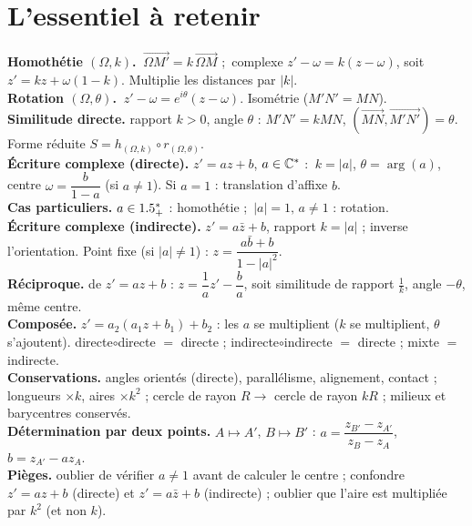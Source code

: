\section{L'essentiel à retenir}

\begin{synthese}
\textbf{Homothétie $(\Omega,k)$.} $\ \overrightarrow{\Omega M'}=k\,\overrightarrow{\Omega M}$ ;\
complexe $z'-\omega=k(z-\omega)$, soit $z'=kz+\omega(1-k)$. Multiplie les distances par $|k|$.\\[4pt]
\textbf{Rotation $(\Omega,\theta)$.} $\ z'-\omega=e^{i\theta}(z-\omega)$. Isométrie ($M'N'=MN$).\\[4pt]
\textbf{Similitude directe.} rapport $k>0$, angle $\theta$ : $M'N'=kMN$, $(\overrightarrow{MN},\overrightarrow{M'N'})=\theta$.
Forme réduite $S=h_{(\Omega,k)}\circ r_{(\Omega,\theta)}$.\\[4pt]
\textbf{Écriture complexe (directe).} $z'=az+b$, $a\in\mathbb{C}^*$ : $\ k=|a|$, $\theta=\arg(a)$, centre
$\omega=\dfrac{b}{1-a}$ (si $a\neq1$). Si $a=1$ : translation d'affixe $b$.\\[4pt]
\textbf{Cas particuliers.} $a\in1.5_+^*$ : homothétie ;\ $|a|=1,\,a\neq1$ : rotation.\\[4pt]
\textbf{Écriture complexe (indirecte).} $z'=a\bar z+b$, rapport $k=|a|$ ; inverse l'orientation. Point
fixe (si $|a|\neq1$) : $z=\dfrac{a\bar b+b}{1-|a|^2}$.\\[4pt]
\textbf{Réciproque.} de $z'=az+b$ : $z=\dfrac1a z'-\dfrac ba$, soit similitude de rapport $\tfrac1k$, angle $-\theta$,
même centre.\\[4pt]
\textbf{Composée.} $z'=a_2(a_1z+b_1)+b_2$ : les $a$ se multiplient ($k$ se multiplient, $\theta$ s'ajoutent).
directe$\circ$directe $=$ directe ; indirecte$\circ$indirecte $=$ directe ; mixte $=$ indirecte.\\[4pt]
\textbf{Conservations.} angles orientés (directe), parallélisme, alignement, contact ; longueurs $\times k$,
aires $\times k^2$ ; cercle de rayon $R\to$ cercle de rayon $kR$ ; milieux et barycentres conservés.\\[4pt]
\textbf{Détermination par deux points.} $A\mapsto A'$, $B\mapsto B'$ : $a=\dfrac{z_{B'}-z_{A'}}{z_B-z_A}$,\
$b=z_{A'}-a z_A$.\\[4pt]
\textbf{Pièges.} oublier de vérifier $a\neq1$ avant de calculer le centre ; confondre $z'=az+b$ (directe)
et $z'=a\bar z+b$ (indirecte) ; oublier que l'aire est multipliée par $k^2$ (et non $k$).
\end{synthese}

